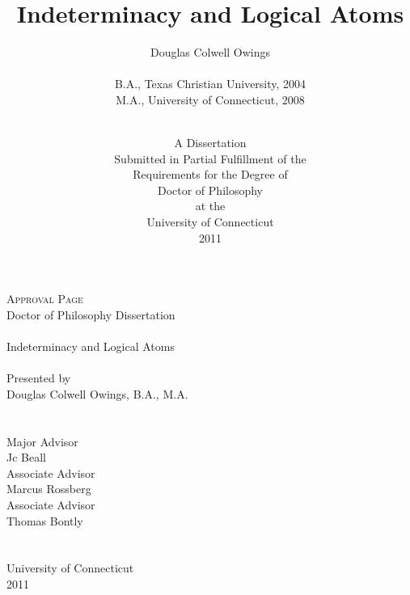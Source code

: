 \title{Indeterminacy and Logical Atoms}
\author{Douglas Colwell Owings \\ \hspace{10pt} \\ B.A., Texas Christian University, 2004 \\ M.A., University of Connecticut, 2008}
\date{\hspace{10pt} \\ A Dissertation \\ Submitted in Partial Fulfillment of the \\ Requirements for the Degree of \\ Doctor of Philosophy \\ at the \\ University of Connecticut \\ 2011 }
\maketitle
\pagebreak
\begin{center}
\Large{\textsc{Approval Page}} \\
\normalsize Doctor of Philosophy Dissertation \\ \hspace*{15pt} \\
\Large{Indeterminacy and Logical Atoms} \\
\hspace*{15pt} \\
\normalsize{Presented by \\
Douglas Colwell Owings, B.A., M.A.\\
\hspace*{15pt} \\ \hspace*{15pt} \\
Major Advisor\underline{\hspace*{225pt}} }\\
\small Jc Beall \\
\normalsize Associate Advisor\underline{\hspace*{205pt}} \\
\small{Marcus Rossberg} \\
\normalsize{Associate Advisor\underline{\hspace*{205pt}}} \\
\small{Thomas Bontly} \\
\normalsize
\hspace*{15pt} \\ \hspace*{15pt} \\
University of Connecticut \\ 2011
\end{center}
\pagebreak

